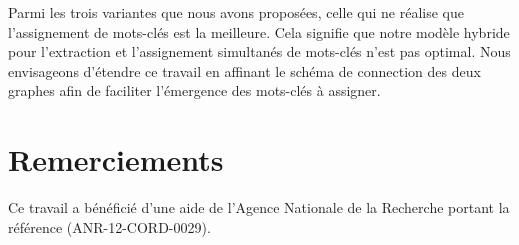 \documentclass[10pt,twoside]{article}
\begin{document}
        Parmi les trois variantes que nous avons proposées, celle qui ne réalise que l'assignement de mots-clés est la meilleure.
        Cela signifie que notre modèle hybride pour l'extraction et l'assignement simultanés de mots-clés n'est pas optimal.
        Nous envisageons d'étendre ce travail en affinant le schéma de connection des deux graphes afin de faciliter l'émergence des mots-clés à assigner.

    \section*{Remerciements}
        Ce travail a bénéficié d'une aide de l'Agence Nationale de la Recherche portant la référence \mbox{(ANR-12-CORD-0029)}.
    
    
    \renewcommand\refname{Références}
    
\end{document}
